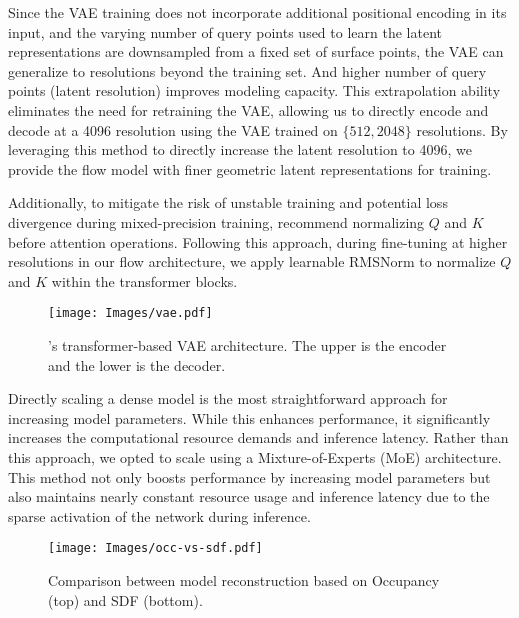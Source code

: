 Since the VAE training does not incorporate additional positional encoding in its input, and the varying number of query points used to learn the latent representations are downsampled from a fixed set of surface points, the VAE can generalize to resolutions beyond the training set. And higher number of query points (latent resolution) improves modeling capacity. This extrapolation ability eliminates the need for retraining the VAE, allowing us to directly encode and decode at a 4096 resolution using the VAE trained on $\{512, 2048\}$ resolutions. By leveraging this method to directly increase the latent resolution to 4096, we provide the flow model with finer geometric latent representations for training.

Additionally, to mitigate the risk of unstable training and potential loss divergence during mixed-precision training, \cite{dehghani2023scaling} recommend normalizing $Q$ and $K$ before attention operations. Following this approach, during fine-tuning at higher resolutions in our flow architecture, we apply learnable RMSNorm\cite{zhang2019root} to normalize $Q$ and $K$ within the transformer blocks.

\begin{figure}
    \centering
    \texttt{[image: Images/vae.pdf]}
    \caption{\method{}'s transformer-based VAE architecture. The upper is the encoder and the lower is the decoder.}
    \label{fig:vae}
\end{figure}

Directly scaling a dense model is the most straightforward approach for increasing model parameters. While this enhances performance, it significantly increases the computational resource demands and inference latency. 
Rather than this approach, we opted to scale using a Mixture-of-Experts (MoE) architecture. This method not only boosts performance by increasing model parameters but also maintains nearly constant resource usage and inference latency due to the sparse activation of the network during inference.

\begin{figure}[t]
    \centering
    \texttt{[image: Images/occ-vs-sdf.pdf]}
    \caption{Comparison between model reconstruction based on Occupancy (top) and SDF (bottom).}
    \label{fig:occ-vs-sdf}
\end{figure}

